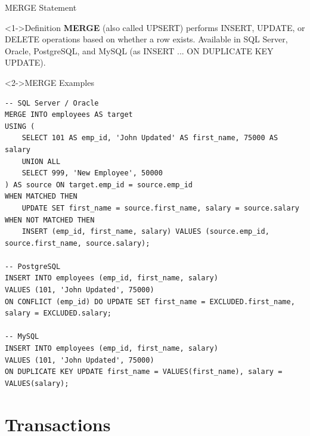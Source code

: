 \documentclass[aspectratio=169,11pt]{beamer}
\begin{document}
\begin{frame}[fragile]{MERGE Statement}
\begin{block}<1->{Definition}
\textbf{MERGE} (also called UPSERT) performs INSERT, UPDATE, or DELETE operations based on whether a row exists. Available in SQL Server, Oracle, PostgreSQL, and MySQL (as INSERT ... ON DUPLICATE KEY UPDATE).
\end{block}

\pause
\begin{exampleblock}<2->{MERGE Examples}
\begin{lstlisting}
-- SQL Server / Oracle
MERGE INTO employees AS target
USING (
    SELECT 101 AS emp_id, 'John Updated' AS first_name, 75000 AS salary
    UNION ALL
    SELECT 999, 'New Employee', 50000
) AS source ON target.emp_id = source.emp_id
WHEN MATCHED THEN
    UPDATE SET first_name = source.first_name, salary = source.salary
WHEN NOT MATCHED THEN
    INSERT (emp_id, first_name, salary) VALUES (source.emp_id, source.first_name, source.salary);

-- PostgreSQL
INSERT INTO employees (emp_id, first_name, salary)
VALUES (101, 'John Updated', 75000)
ON CONFLICT (emp_id) DO UPDATE SET first_name = EXCLUDED.first_name, salary = EXCLUDED.salary;

-- MySQL
INSERT INTO employees (emp_id, first_name, salary)
VALUES (101, 'John Updated', 75000)
ON DUPLICATE KEY UPDATE first_name = VALUES(first_name), salary = VALUES(salary);
\end{lstlisting}
\end{exampleblock}
\end{frame}

\section{Transactions}
\end{document}
